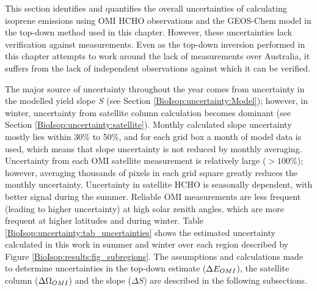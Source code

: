   This section identifies and quantifies the overall uncertainties of calculating isoprene emissions using OMI HCHO observations and the GEOS-Chem model in the top-down method used in this chapter.
  However, these uncertainties lack verification against measurements.
  Even as the top-down inversion performed in this chapter attempts to work around the lack of measurements over Australia, it suffers from the lack of independent observations against which it can be verified.
  
  The major source of uncertainty throughout the year comes from uncertainty in the modelled yield slope $S$ (see Section \ref{BioIsop:uncertainty:Model}); however, in winter, uncertainty from satellite column calculation becomes dominant (see Section \ref{BioIsop:uncertainty:satellite}).
  Monthly calculated slope uncertainty mostly lies within 30\% to 50\%, and for each grid box a month of model data is used, which means that slope uncertainty is not reduced by monthly averaging.
  Uncertainty from each OMI satellite measurement is relatively large ($>100\%$); however, averaging thousands of pixels in each grid square greatly reduces the monthly uncertainty.
  Uncertainty in satellite HCHO is seasonally dependent, with better signal during the summer.
  Reliable OMI measurements are less frequent (leading to higher uncertainty) at high solar zenith angles, which are more frequent at higher latitudes and during winter.
  Table \ref{BioIsop:uncertainty:tab_uncertainties} shows the estimated uncertainty calculated in this work in summer and winter over each region described by Figure \ref{BioIsop:results:fig_subregions}.
  The assumptions and calculations made to determine uncertainties in the top-down estimate ($\Delta E_{OMI}$), the satellite column ($\Delta \Omega_{OMI}$) and the slope ($\Delta S$) are described in the following subsections.
  
